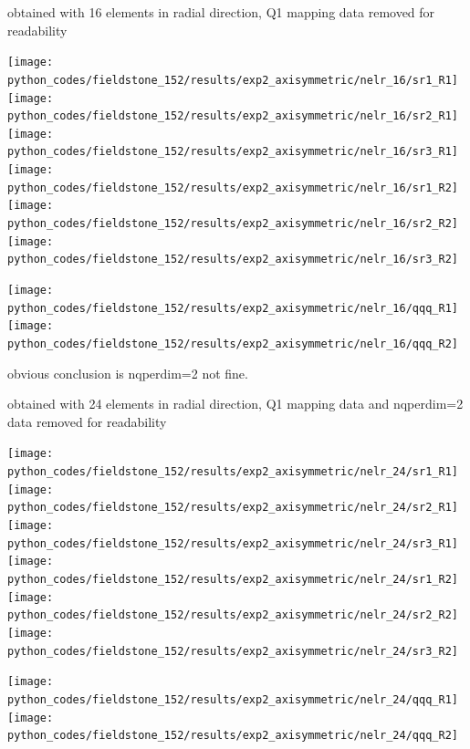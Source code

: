 \newpage

obtained with 16 elements in radial direction, Q1 mapping data removed for readability

\begin{center}
\texttt{[image: python\_codes/fieldstone\_152/results/exp2\_axisymmetric/nelr\_16/sr1\_R1]}
\texttt{[image: python\_codes/fieldstone\_152/results/exp2\_axisymmetric/nelr\_16/sr2\_R1]}
\texttt{[image: python\_codes/fieldstone\_152/results/exp2\_axisymmetric/nelr\_16/sr3\_R1]}\\
\texttt{[image: python\_codes/fieldstone\_152/results/exp2\_axisymmetric/nelr\_16/sr1\_R2]}
\texttt{[image: python\_codes/fieldstone\_152/results/exp2\_axisymmetric/nelr\_16/sr2\_R2]}
\texttt{[image: python\_codes/fieldstone\_152/results/exp2\_axisymmetric/nelr\_16/sr3\_R2]}\\
\end{center}

\begin{center}
\texttt{[image: python\_codes/fieldstone\_152/results/exp2\_axisymmetric/nelr\_16/qqq\_R1]}
\texttt{[image: python\_codes/fieldstone\_152/results/exp2\_axisymmetric/nelr\_16/qqq\_R2]}
\end{center}

obvious conclusion is nqperdim=2 not fine.

\newpage

obtained with 24 elements in radial direction, Q1 mapping data and nqperdim=2 data removed for readability

\begin{center}
\texttt{[image: python\_codes/fieldstone\_152/results/exp2\_axisymmetric/nelr\_24/sr1\_R1]}
\texttt{[image: python\_codes/fieldstone\_152/results/exp2\_axisymmetric/nelr\_24/sr2\_R1]}
\texttt{[image: python\_codes/fieldstone\_152/results/exp2\_axisymmetric/nelr\_24/sr3\_R1]}\\
\texttt{[image: python\_codes/fieldstone\_152/results/exp2\_axisymmetric/nelr\_24/sr1\_R2]}
\texttt{[image: python\_codes/fieldstone\_152/results/exp2\_axisymmetric/nelr\_24/sr2\_R2]}
\texttt{[image: python\_codes/fieldstone\_152/results/exp2\_axisymmetric/nelr\_24/sr3\_R2]}\\
\end{center}

\begin{center}
\texttt{[image: python\_codes/fieldstone\_152/results/exp2\_axisymmetric/nelr\_24/qqq\_R1]}
\texttt{[image: python\_codes/fieldstone\_152/results/exp2\_axisymmetric/nelr\_24/qqq\_R2]}
\end{center}

